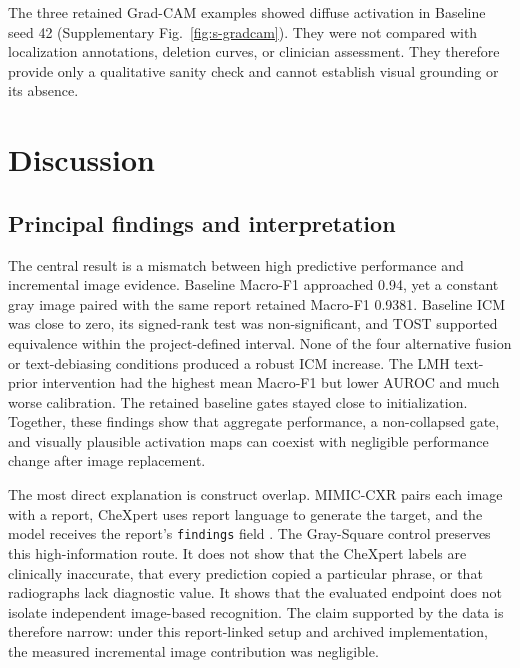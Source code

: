 \documentclass[a4paper,fleqn]{cas-sc}
\begin{document}
The three retained Grad-CAM examples showed diffuse activation in Baseline seed
42 (Supplementary Fig.~\ref{fig:s-gradcam}). They were not compared with
localization annotations, deletion curves, or clinician assessment. They
therefore provide only a qualitative sanity check and cannot establish visual
grounding or its absence.

\FloatBarrier
\section{Discussion}\label{sec:discussion}

\subsection{Principal findings and interpretation}\label{sec:principal}

The central result is a mismatch between high predictive performance and
incremental image evidence. Baseline Macro-F1 approached 0.94, yet a constant
gray image paired with the same report retained Macro-F1 0.9381. Baseline ICM
was close to zero, its signed-rank test was non-significant, and TOST supported
equivalence within the project-defined interval. None of the four alternative
fusion or text-debiasing conditions produced a robust ICM increase. The LMH
text-prior intervention had the highest mean Macro-F1 but lower AUROC and much
worse calibration. The retained baseline gates stayed close to initialization.
Together, these findings show that aggregate performance, a non-collapsed gate,
and visually plausible activation maps can coexist with negligible performance
change after image replacement.

The most direct explanation is construct overlap. MIMIC-CXR pairs each image
with a report, CheXpert uses report language to generate the target, and the
model receives the report's \texttt{findings} field
\cite{johnson2019mimiccxr,irvin2019chexpert}. The Gray-Square control preserves
this high-information route. It does not show that the CheXpert labels are
clinically inaccurate, that every prediction copied a particular phrase, or that
radiographs lack diagnostic value. It shows that the evaluated endpoint does
not isolate independent image-based recognition. The claim supported by the
data is therefore narrow: under this report-linked setup and archived
implementation, the measured incremental image contribution was negligible.
\end{document}
